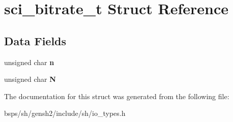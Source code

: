 \hypertarget{structsci__bitrate__t}{}\section{sci\+\_\+bitrate\+\_\+t Struct Reference}
\label{structsci__bitrate__t}
\subsection*{Data Fields}
\begin{DoxyCompactItemize}
\item 
\mbox{\label{structsci__bitrate__t_a73083e95b6934a57d74fdd09af575374}} 
unsigned char {\bfseries n}
\item 
\mbox{\label{structsci__bitrate__t_af4298b3afab12bda47f2fe7f5996427c}} 
unsigned char {\bfseries N}
\end{DoxyCompactItemize}


The documentation for this struct was generated from the following file\+:\begin{DoxyCompactItemize}
\item 
bsps/sh/gensh2/include/sh/io\+\_\+types.\+h\end{DoxyCompactItemize}
